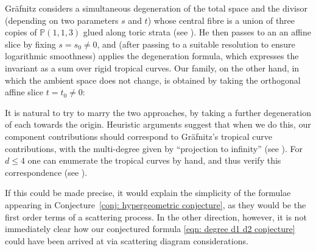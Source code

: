 \documentclass[11pt]{amsart}
\theoremstyle{definition}
\theoremstyle{definition}
\newcommand{\PP}{\mathbb{P}}
\begin{document}
Gr\"afnitz considers a simultaneous degeneration of the total space and the divisor (depending on two parameters $s$ and $t$) whose central fibre is a union of three copies of $\PP(1,1,3)$ glued along toric strata (see \cite[Example 1.5]{Graefnitz}). He then passes to an an affine slice by fixing $s = s_0 \neq 0$, and (after passing to a suitable resolution to ensure logarithmic smoothness) applies the degeneration formula, which expresses the invariant as a sum over rigid tropical curves. Our family, on the other hand, in which the ambient space does not change, is obtained by taking the orthogonal affine slice $t = t_0 \neq 0$:
\begin{center}
\end{center}
It is natural to try to marry the two approaches, by taking a further degeneration of each towards the origin. Heuristic arguments suggest that when we do this, our component contributions should correspond to Gr\"afnitz's tropical curve contributions, with the multi-degree given by ``projection to infinity'' (see \cite[Figure 3.4 and Remark 4.16]{Graefnitz}). For $d \leq 4$ one can enumerate the tropical curves by hand, and thus verify this correspondence (see \cite[\S 7.1.2]{Graefnitz}).

If this could be made precise, it would explain the simplicity of the formulae appearing in Conjecture~\ref{conj: hypergeometric conjecture}, as they would be the first order terms of a scattering process. In the other direction, however, it is not immediately clear how our conjectured formula \eqref{eqn: degree d1 d2 conjecture} could have been arrived at via scattering diagram considerations.
\end{document}
